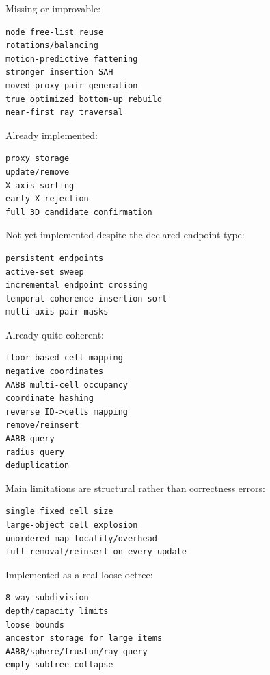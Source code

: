 Missing or improvable:

\begin{verbatim}
node free-list reuse
rotations/balancing
motion-predictive fattening
stronger insertion SAH
moved-proxy pair generation
true optimized bottom-up rebuild
near-first ray traversal
\end{verbatim}

\textbf{}

Already implemented:

\begin{verbatim}
proxy storage
update/remove
X-axis sorting
early X rejection
full 3D candidate confirmation
\end{verbatim}

Not yet implemented despite the declared endpoint type:

\begin{verbatim}
persistent endpoints
active-set sweep
incremental endpoint crossing
temporal-coherence insertion sort
multi-axis pair masks
\end{verbatim}

\textbf{}

Already quite coherent:

\begin{verbatim}
floor-based cell mapping
negative coordinates
AABB multi-cell occupancy
coordinate hashing
reverse ID->cells mapping
remove/reinsert
AABB query
radius query
deduplication
\end{verbatim}

Main limitations are structural rather than correctness errors:

\begin{verbatim}
single fixed cell size
large-object cell explosion
unordered_map locality/overhead
full removal/reinsert on every update
\end{verbatim}

\textbf{}

Implemented as a real loose octree:

\begin{verbatim}
8-way subdivision
depth/capacity limits
loose bounds
ancestor storage for large items
AABB/sphere/frustum/ray query
empty-subtree collapse
\end{verbatim}

